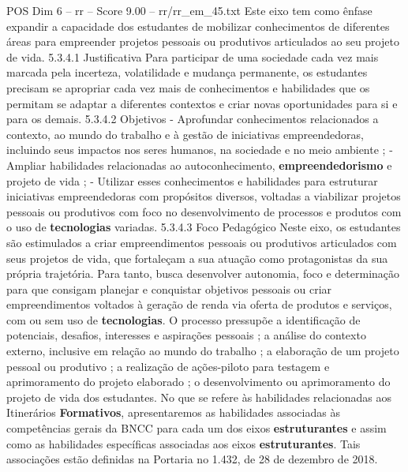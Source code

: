\begin{textsample}{POS Dim 6 – rr – Score 9.00 – rr/rr\_em\_45.txt}
Este eixo tem como ênfase expandir a capacidade dos estudantes de mobilizar conhecimentos de diferentes áreas para empreender projetos pessoais ou produtivos articulados ao seu projeto de vida. 5.3.4.1 Justificativa Para participar de uma sociedade cada vez mais marcada pela incerteza, volatilidade e mudança permanente, os estudantes precisam se apropriar cada vez mais de conhecimentos e habilidades que os permitam se adaptar a diferentes contextos e criar novas oportunidades para si e para os demais. 5.3.4.2 Objetivos - Aprofundar conhecimentos relacionados a contexto, ao mundo do trabalho e à gestão de iniciativas empreendedoras, incluindo seus impactos nos seres humanos, na sociedade e no meio ambiente ; - Ampliar habilidades relacionadas ao autoconhecimento, \textbf{empreendedorismo} e projeto de vida ; - Utilizar esses conhecimentos e habilidades para estruturar iniciativas empreendedoras com propósitos diversos, voltadas a viabilizar projetos pessoais ou produtivos com foco no desenvolvimento de processos e produtos com o uso de \textbf{tecnologias} variadas. 5.3.4.3 Foco Pedagógico Neste eixo, os estudantes são estimulados a criar empreendimentos pessoais ou produtivos articulados com seus projetos de vida, que fortaleçam a sua atuação como protagonistas da sua própria trajetória.
Para tanto, busca desenvolver autonomia, foco e determinação para que consigam planejar e conquistar objetivos pessoais ou criar empreendimentos voltados à geração de renda via oferta de produtos e serviços, com ou sem uso de \textbf{tecnologias}.
O processo pressupõe a identificação de potenciais, desafios, interesses e aspirações pessoais ; a análise do contexto externo, inclusive em relação ao mundo do trabalho ; a elaboração de um projeto pessoal ou produtivo ; a realização de ações-piloto para testagem e aprimoramento do projeto elaborado ; o desenvolvimento ou aprimoramento do projeto de vida dos estudantes.
No que se refere às habilidades relacionadas aos Itinerários \textbf{Formativos}, apresentaremos as habilidades associadas às competências gerais da BNCC para cada um dos eixos \textbf{estruturantes} e assim como as habilidades específicas associadas aos eixos \textbf{estruturantes}.
Tais associações estão definidas na Portaria no 1.432, de 28 de dezembro de 2018.

\end{textsample}
